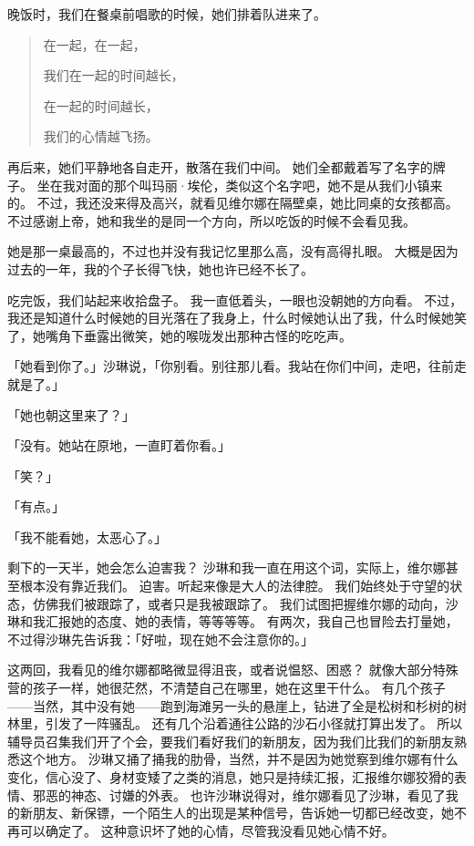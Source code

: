 \documentclass[UTF8]{ctexart}
\begin{document}
晚饭时，我们在餐桌前唱歌的时候，她们排着队进来了。

\begin{verse}
    在一起，在一起，
    
    我们在一起的时间越长，

    在一起的时间越长，

    我们的心情越飞扬。
\end{verse}

再后来，她们平静地各自走开，散落在我们中间。
她们全都戴着写了名字的牌子。
坐在我对面的那个叫玛丽·埃伦，类似这个名字吧，她不是从我们小镇来的。
不过，我还没来得及高兴，就看见维尔娜在隔壁桌，她比同桌的女孩都高。
不过感谢上帝，她和我坐的是同一个方向，所以吃饭的时候不会看见我。

她是那一桌最高的，不过也并没有我记忆里那么高，没有高得扎眼。
大概是因为过去的一年，我的个子长得飞快，她也许已经不长了。

吃完饭，我们站起来收拾盘子。
我一直低着头，一眼也没朝她的方向看。
不过，我还是知道什么时候她的目光落在了我身上，什么时候她认出了我，什么时候她笑了，她嘴角下垂露出微笑，她的喉咙发出那种古怪的吃吃声。

「她看到你了。」沙琳说，「你别看。别往那儿看。我站在你们中间，走吧，往前走就是了。」

「她也朝这里来了？」

「没有。她站在原地，一直盯着你看。」

「笑？」

「有点。」

「我不能看她，太恶心了。」

剩下的一天半，她会怎么迫害我？
沙琳和我一直在用这个词，实际上，维尔娜甚至根本没有靠近我们。
迫害。听起来像是大人的法律腔。
我们始终处于守望的状态，仿佛我们被跟踪了，或者只是我被跟踪了。
我们试图把握维尔娜的动向，沙琳和我汇报她的态度、她的表情，等等等等。
有两次，我自己也冒险去打量她，不过得沙琳先告诉我：「好啦，现在她不会注意你的。」

这两回，我看见的维尔娜都略微显得沮丧，或者说愠怒、困惑？
就像大部分特殊营的孩子一样，她很茫然，不清楚自己在哪里，她在这里干什么。
有几个孩子——当然，其中没有她——跑到海滩另一头的悬崖上，钻进了全是松树和杉树的树林里，引发了一阵骚乱。
还有几个沿着通往公路的沙石小径就打算出发了。
所以辅导员召集我们开了个会，要我们看好我们的新朋友，因为我们比我们的新朋友熟悉这个地方。
沙琳又捅了捅我的肋骨，当然，并不是因为她觉察到维尔娜有什么变化，信心没了、身材变矮了之类的消息，她只是持续汇报，汇报维尔娜狡猾的表情、邪恶的神态、讨嫌的外表。
也许沙琳说得对，维尔娜看见了沙琳，看见了我的新朋友、新保镖，一个陌生人的出现是某种信号，告诉她一切都已经改变，她不再可以确定了。
这种意识坏了她的心情，尽管我没看见她心情不好。
\end{document}
